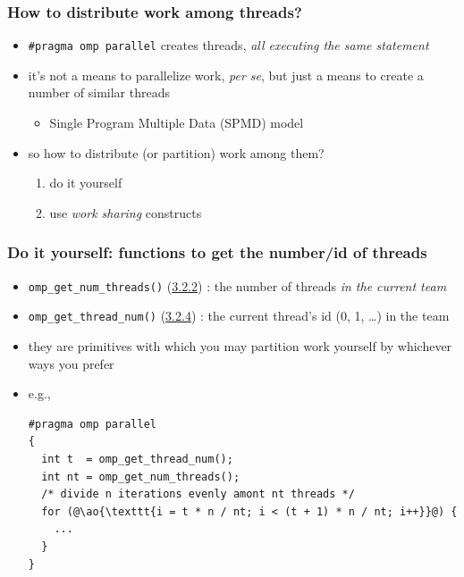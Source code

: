 \documentclass[12pt,dvipdfmx]{beamer}
\newcommand{\sectionompgetnumthreads}{{\href{https://www.openmp.org/spec-html/5.0/openmpsu111.html\#x148-6450003.2.2}{3.2.2}}}
\newcommand{\sectionompgetmaxthreads}{{\href{https://www.openmp.org/spec-html/5.0/openmpsu112.html\#x149-6510003.2.3}{3.2.3}}}
\newcommand{\sectionompgetthreadnum}{{\href{https://www.openmp.org/spec-html/5.0/openmpsu113.html\#x150-6570003.2.4}{3.2.4}}}
\newcommand{\ao}[1]{{\color{blue}#1}}
\newcommand{\aka}[1]{{\color{red}#1}}
\begin{document}
\begin{frame}
\frametitle{How to distribute work among threads?}
\begin{itemize}
\item {\tt \#pragma omp parallel} creates threads, 
  \aka{\em all executing the same statement}
\item it's not a means to parallelize work, {\em per se}, 
  but just a means to create a number of similar threads
  \begin{itemize}
  \item Single Program Multiple Data \ao{(SPMD)} model
  \end{itemize}
  
\item so how to distribute (or partition) work among them?
  \begin{enumerate}
  \item do it yourself
  \item use \ao{\em work sharing} constructs
  \end{enumerate}
\end{itemize}
\end{frame}

\begin{frame}[fragile]
\frametitle{Do it yourself: functions to get the number/id of threads}

\begin{itemize}
\item \ao{\tt omp\_get\_num\_threads()} 
(\sectionompgetnumthreads) : the number of threads 
  {\em in the current team\/}
\item \ao{\tt omp\_get\_thread\_num()} 
(\sectionompgetthreadnum) : the current thread's id 
  (0, 1, \ldots) in the team

\item they are primitives with which you may
  partition work yourself by whichever ways you
  prefer

\item e.g.,
\begin{lstlisting}
#pragma omp parallel
{
  int t  = omp_get_thread_num();
  int nt = omp_get_num_threads();
  /* divide n iterations evenly amont nt threads */
  for (@\ao{\texttt{i = t * n / nt; i < (t + 1) * n / nt; i++}}@) {
    ...
  }
}
\end{lstlisting}
\end{itemize}
\end{frame}
\end{document}
